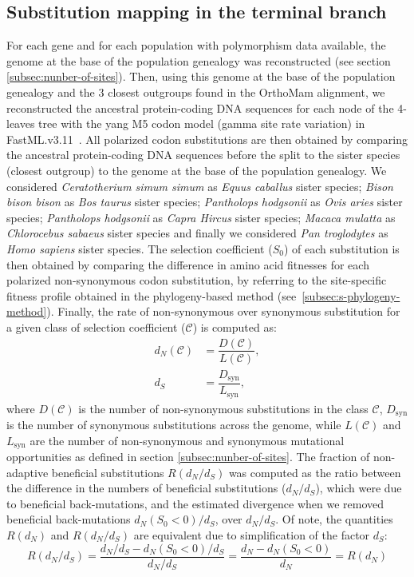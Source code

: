 \documentclass{article}
\newcommand{\dn}{d_N}
\newcommand{\ds}{d_S}
\newcommand{\dnds}{\dn / \ds}
\newcommand{\Sphy}{S_{0}}
\newcommand{\Sphyclass}{\mathcal{C}}
\begin{document}
    \subsection{Substitution mapping in the terminal branch}
    \label{subsec:substitution-mapping-in-the-terminal-branch}
    For each gene and for each population with polymorphism data available, the genome at the base of the population genealogy was reconstructed (see section \ref{subsec:nunber-of-sites}).
    Then, using this genome at the base of the population genealogy and the $3$ closest outgroups found in the OrthoMam alignment, we reconstructed the ancestral protein-coding DNA sequences for each node of the 4-leaves tree with the yang M5 codon model (gamma site rate variation) in FastML.v3.11~\cite{ashkenazy_fastml_2012}.
    All polarized codon substitutions are then obtained by comparing the ancestral protein-coding DNA sequences before the split to the sister species (closest outgroup) to the genome at the base of the population genealogy.
    We considered \textit{Ceratotherium simum simum} as \textit{Equus caballus} sister species; \textit{Bison bison bison} as \textit{Bos taurus} sister species; \textit{Pantholops hodgsonii} as \textit{Ovis aries} sister species; \textit{Pantholops hodgsonii} as \textit{Capra Hircus} sister species; \textit{Macaca mulatta} as \textit{Chlorocebus sabaeus} sister species and finally we considered \textit{Pan troglodytes} as \textit{Homo sapiens} sister species.
    The selection coefficient ($\Sphy$) of each substitution is then obtained by comparing the difference in amino acid fitnesses for each polarized non-synonymous codon substitution, by referring to the site-specific fitness profile obtained in the phylogeny-based method (see~\ref{subsec:s-phylogeny-method}).
    Finally, the rate of non-synonymous over synonymous substitution for a given class of selection coefficient ($\Sphyclass$) is computed as:
    \begin{align}
        \dn \left( \Sphyclass \right) &= \dfrac{D\left( \Sphyclass \right)}{L \left( \Sphyclass \right)}, \\
        \ds &= \dfrac{D_{\textrm{syn}}}{L_{\textrm{syn}}},
    \end{align}
    where $D \left( \Sphyclass \right) $ is the number of non-synonymous substitutions in the class $\Sphyclass$, $D_{\textrm{syn}}$ is the number of synonymous substitutions across the genome, while $L \left( \Sphyclass \right)$ and $L_{\textrm{syn}}$ are the number of non-synonymous and synonymous mutational opportunities as defined in section \ref{subsec:nunber-of-sites}.
    The fraction of non-adaptive beneficial substitutions $R(\dnds)$ was computed as the ratio between the difference in the numbers of beneficial substitutions ($\dnds$), which were due to beneficial back-mutations, and the estimated divergence when we removed beneficial back-mutations $\dn (\Sphy < 0) / \ds$, over $\dnds$.
    Of note, the quantities $R(\dn)$ and $R(\dnds)$ are equivalent due to simplification of the factor $\ds$:
    \begin{equation}
        R(\dnds) = \dfrac{\dnds - \dn(\Sphy < 0) / \ds}{\dnds} = \dfrac{\dn - \dn(\Sphy < 0)}{\dn} = R(\dn)
    \end{equation}
\end{document}
